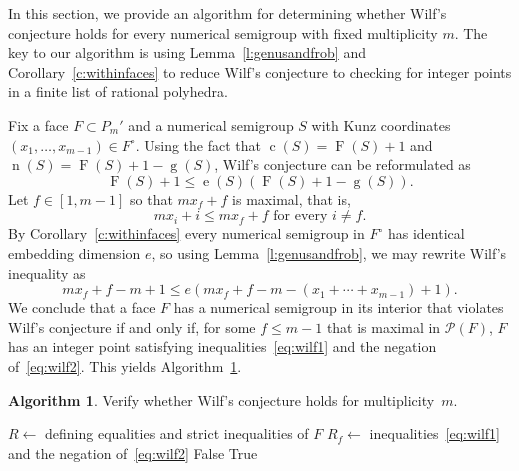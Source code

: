 \documentclass[12pt]{amsart}
\theoremstyle{definition}
\newtheorem{alg}[thm]{Algorithm}
\numberwithin{equation}{section}
\renewcommand\>{\rangle}
\newcommand\<{\langle}
\newcommand\0{\mathbf{0}}
\begin{document}
In this section, we provide an algorithm for determining whether Wilf's conjecture holds for every numerical semigroup with fixed multiplicity $m$.  The key to our algorithm is using Lemma~\ref{l:genusandfrob} and Corollary~\ref{c:withinfaces} to reduce Wilf's conjecture to checking for integer points in a finite list of rational polyhedra.  

Fix a face $F \subset P_m'$ and a numerical semigroup $S$ with Kunz coordinates $(x_1, \ldots, x_{m-1}) \in F^\circ$.  Using the fact that $\operatorname c(S) = \operatorname F(S) + 1$ and $\operatorname n(S) = \operatorname F(S) + 1 - \operatorname g(S)$, Wilf's conjecture can be reformulated as
\[
\operatorname F(S) + 1 \le \operatorname e(S)(\operatorname F(S) + 1 - \operatorname g(S)).
\]
Let $f \in [1, m-1]$ so that $mx_f + f$ is maximal, that is, 
\begin{equation}\label{eq:wilf1}
mx_i + i \le mx_f + f \text{ for every } i \ne f.
\end{equation}
By Corollary~\ref{c:withinfaces} every numerical semigroup in $F^\circ$ has identical embedding dimension $e$, so using Lemma~\ref{l:genusandfrob}, we may rewrite Wilf's inequality as
\begin{equation}\label{eq:wilf2}
mx_f + f - m + 1 \le e(mx_f + f - m - (x_1 + \cdots + x_{m-1}) + 1).
\end{equation}
We conclude that a face $F$ has a numerical semigroup in its interior that violates Wilf's conjecture if and only if, for some $f \le m - 1$ that is maximal in $\mathcal P(F)$, $F$ has an integer point satisfying inequalities~\eqref{eq:wilf1} and the negation of~\eqref{eq:wilf2}.  This yields Algorithm~\ref{a:wilfmultiplicity}.  
\begin{alg}\label{a:wilfmultiplicity}
Verify whether Wilf's conjecture holds for multiplicity~$m$.
\begin{algorithmic}
	\State $R \gets$ defining equalities and strict inequalities of $F$
		\State $R_f \gets$ inequalities~\eqref{eq:wilf1} and the negation of~\eqref{eq:wilf2}
			\State \Return False
		\EndIf
	\EndFor
\EndFor
\State \Return True
\EndFunction
\end{algorithmic}
\end{alg}
\end{document}
